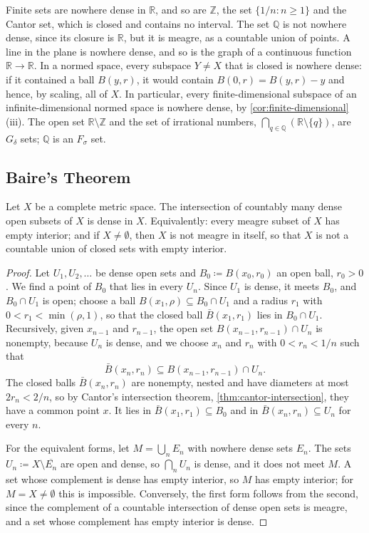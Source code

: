 Finite sets are nowhere dense in $\mathbb R$, and so are $\mathbb Z$, the set $\{1/n: n\ge1\}$ and the Cantor set, which is closed and contains no interval. The set $\mathbb Q$ is not nowhere dense, since its closure is $\mathbb R$, but it is meagre, as a countable union of points. A line in the plane is nowhere dense, and so is the graph of a continuous function $\mathbb R\to\mathbb R$. In a normed space, every subspace $Y\ne X$ that is closed is nowhere dense: if it contained a ball $B(y,r)$, it would contain $B(0,r)=B(y,r)-y$ and hence, by scaling, all of $X$. In particular, every finite-dimensional subspace of an infinite-dimensional normed space is nowhere dense, by \cref{cor:finite-dimensional}\,(iii). The open set $\mathbb R\setminus\mathbb Z$ and the set of irrational numbers, $\bigcap_{q\in\mathbb Q}(\mathbb R\setminus\{q\})$, are $G_\delta$ sets; $\mathbb Q$ is an $F_\sigma$ set.

\subsection{Baire's Theorem}

\begin{theorem}
\label{thm:baire}
Let $X$ be a complete metric space. The intersection of countably many dense open subsets of $X$ is dense in $X$. Equivalently: every meagre subset of $X$ has empty interior; and if $X\ne\emptyset$, then $X$ is not meagre in itself, so that $X$ is not a countable union of closed sets with empty interior.
\end{theorem}

\begin{proof}
Let $U_1,U_2,\ldots$ be dense open sets and $B_0\coloneqq B(x_0,r_0)$ an open ball, $r_0>0$. We find a point of $B_0$ that lies in every $U_n$. Since $U_1$ is dense, it meets $B_0$, and $B_0\cap U_1$ is open; choose a ball $B(x_1,\rho)\subseteq B_0\cap U_1$ and a radius $r_1$ with $0<r_1<\min(\rho,1)$, so that the closed ball $\bar B(x_1,r_1)$ lies in $B_0\cap U_1$. Recursively, given $x_{n-1}$ and $r_{n-1}$, the open set $B(x_{n-1},r_{n-1})\cap U_n$ is nonempty, because $U_n$ is dense, and we choose $x_n$ and $r_n$ with $0<r_n<1/n$ such that
\[
\bar B(x_n,r_n)\subseteq B(x_{n-1},r_{n-1})\cap U_n .
\]
The closed balls $\bar B(x_n,r_n)$ are nonempty, nested and have diameters at most $2r_n<2/n$, so by Cantor's intersection theorem, \cref{thm:cantor-intersection}, they have a common point $x$. It lies in $\bar B(x_1,r_1)\subseteq B_0$ and in $\bar B(x_n,r_n)\subseteq U_n$ for every $n$.

For the equivalent forms, let $M=\bigcup_nE_n$ with nowhere dense sets $E_n$. The sets $U_n\coloneqq X\setminus\overline{E_n}$ are open and dense, so $\bigcap_nU_n$ is dense, and it does not meet $M$. A set whose complement is dense has empty interior, so $M$ has empty interior; for $M=X\ne\emptyset$ this is impossible. Conversely, the first form follows from the second, since the complement of a countable intersection of dense open sets is meagre, and a set whose complement has empty interior is dense.
\end{proof}

